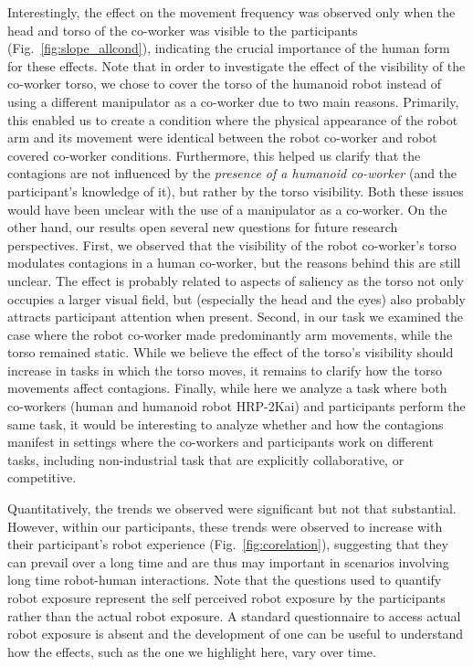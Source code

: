Interestingly, the effect on the movement frequency was observed only when the head and torso of the co-worker was visible to the participants (Fig.~\ref{fig:slope_allcond}), indicating the crucial importance of the human form for these effects. Note that in order to investigate the effect of the visibility of the co-worker torso, we chose to cover the torso of the humanoid robot instead of using a different manipulator as a co-worker due to two main reasons. Primarily, this enabled us to create a condition where the physical appearance of the robot arm and its movement were identical between the robot co-worker and robot covered co-worker conditions. Furthermore, this helped us clarify that the contagions are not influenced by the \textit{presence of a humanoid co-worker} (and the participant's knowledge of it), but rather by the torso visibility. Both these issues would have been unclear with the use of a manipulator as a co-worker. On the other hand, our results open several new questions for future research perspectives. First, we observed that the visibility of the robot co-worker's torso modulates contagions in a  human co-worker, but the reasons behind this are still unclear. The effect is probably related to aspects of saliency as the torso not only occupies a larger visual field, but (especially the head and the eyes) also probably attracts participant attention when present. Second, in our task we examined the case where the robot co-worker made predominantly arm movements, while the torso remained static. While we believe the effect of the torso's visibility should increase in tasks in which the torso moves, it remains to clarify how the torso movements affect contagions. Finally, while here we analyze a task where both co-workers (human and humanoid robot HRP-2Kai) and participants perform the same task, it would be interesting to analyze whether and how the contagions manifest in settings where the co-workers and participants work on different tasks, including non-industrial task that are explicitly collaborative, or competitive.


Quantitatively, the trends we observed were significant but not that substantial. However, within our participants, these trends were observed to increase with their participant's robot experience (Fig.~\ref{fig:corelation}), suggesting that they can prevail over a long time and are thus may important in scenarios involving long time robot-human interactions. Note that the questions used to quantify robot exposure represent the self perceived robot exposure by the participants rather than the actual robot exposure. A standard questionnaire to access actual robot exposure is absent and the development of one can be useful to understand how the effects, such as the one we highlight here, vary over time. 

